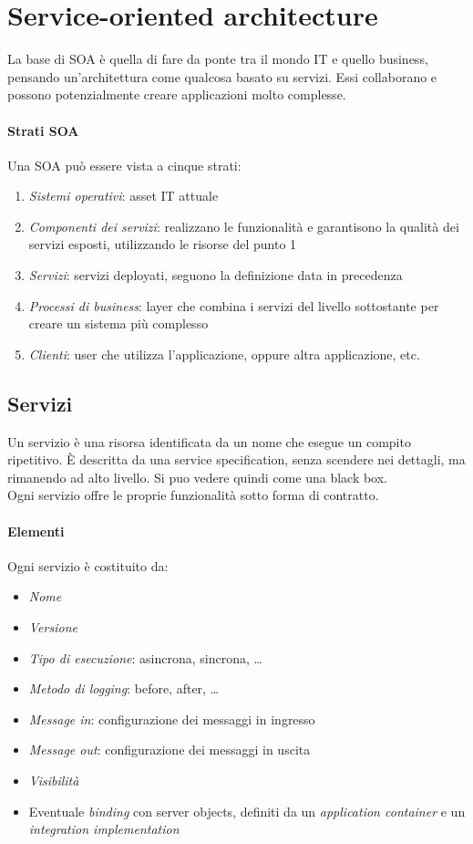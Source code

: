 \section{Service-oriented architecture}
La base di SOA è quella di fare da ponte tra il mondo IT e quello business, 
pensando un'architettura come qualcosa basato su servizi.
Essi collaborano e possono potenzialmente creare applicazioni molto complesse.

\paragraph{Strati SOA}
Una SOA può essere vista a cinque strati:
\begin{enumerate}
    \item \emph{Sistemi operativi}: asset IT attuale
    \item \emph{Componenti dei servizi}: realizzano le funzionalità e garantisono la qualità
    dei servizi esposti, utilizzando le risorse del punto 1
    \item \emph{Servizi}: servizi deployati, 
    seguono la definizione data in precedenza
    \item \emph{Processi di business}: layer che combina i servizi del livello sottostante
    per creare un sistema più complesso
    \item \emph{Clienti}: user che utilizza l'applicazione, oppure altra applicazione, etc. 
\end{enumerate}

\subsection{Servizi}
Un servizio è una risorsa identificata da un nome che esegue un compito ripetitivo.
È descritta da una service specification, senza scendere nei dettagli, ma rimanendo 
ad alto livello. Si puo vedere quindi come una black box.\\
Ogni servizio offre le proprie funzionalità sotto forma di contratto.
\paragraph{Elementi}
Ogni servizio è costituito da:
\begin{itemize}
    \item \emph{Nome}
    \item \emph{Versione}
    \item \emph{Tipo di esecuzione}: asincrona, sincrona, \dots
    \item \emph{Metodo di logging}: before, after, \dots
    \item \emph{Message in}: configurazione dei messaggi in ingresso
    \item \emph{Message out}: configurazione dei messaggi in uscita
    \item \emph{Visibilità}
    \item Eventuale \emph{binding} con server objects, definiti da un \emph{application 
    container} e un \emph{integration implementation}
\end{itemize}

